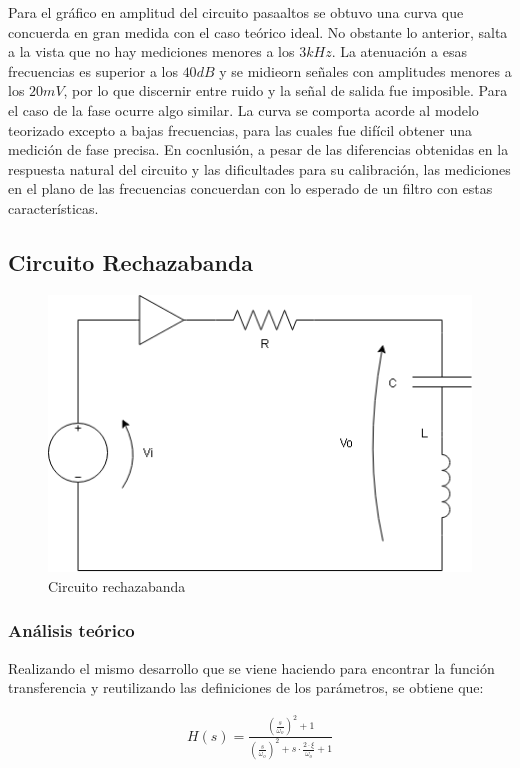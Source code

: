 Para el gráfico en amplitud del circuito pasaaltos se obtuvo una curva que concuerda en gran medida con el caso teórico ideal. No obstante lo anterior, salta a la vista que no hay mediciones menores a los $3kHz$. La atenuación a esas frecuencias es superior a los $40dB$ y se midieorn señales con amplitudes menores a los $20mV$, por lo que discernir entre ruido y la señal de salida fue imposible. Para el caso de la fase ocurre algo similar. La curva se comporta acorde al modelo teorizado excepto a bajas frecuencias, para las cuales fue difícil obtener una medición de fase precisa. En cocnlusión, a pesar de las diferencias obtenidas en la respuesta natural del circuito y las dificultades para su calibración, las mediciones en el plano de las frecuencias concuerdan con lo esperado de un filtro con estas características.

\subsection{Circuito Rechazabanda}

\begin{figure}[H]
    \centering
    \includegraphics[scale=0.5]{Recursos/circuito_notch.png}
    \caption{Circuito rechazabanda}
    \label{fig:circuito_rechazabanda}
\end{figure}

\subsubsection{An\'alisis te\'orico}
Realizando el mismo desarrollo que se viene haciendo para encontrar la funci\'on transferencia y reutilizando las definiciones de los par\'ametros,
se obtiene que:

\begin{eqnarray}
    H(s) = \frac{\left(\frac{s}{\omega_o} \right)^{2} + 1}{\left(\frac{s}{\omega_o} \right)^{2} + s \cdot \frac{2 \cdot \xi}{\omega_o} + 1}
\end{eqnarray}

